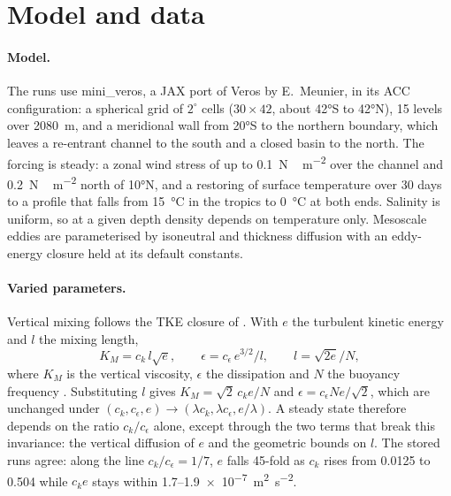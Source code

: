 \documentclass[11pt,a4paper]{article}
\begin{document}
\section{Model and data}
\label{sec:setup}

\paragraph{Model.} The runs use mini\_veros, a JAX port of Veros \cite{hafner2018,hafner2021} by E.~Meunier, in
its ACC configuration: a spherical grid of $2^\circ$ cells ($30\times42$, about \ang{42}S to \ang{42}N), 15 levels
over \SI{2080}{m}, and a meridional wall from \ang{20}S to the northern boundary, which leaves a re-entrant channel
to the south and a closed basin to the north. The forcing is steady: a zonal wind stress of up to
\SI{0.1}{N\,m^{-2}} over the channel and \SI{0.2}{N\,m^{-2}} north of \ang{10}N, and a restoring of surface
temperature over 30 days to a profile that falls from \SI{15}{\celsius} in the tropics to \SI{0}{\celsius} at
both ends. Salinity is uniform, so at a given depth density depends on temperature only. Mesoscale eddies are parameterised by
isoneutral and thickness diffusion \cite{gent1990} with an eddy-energy closure \cite{eden2008} held at its default
constants.

\paragraph{Varied parameters.} Vertical mixing follows the TKE closure of \cite{gaspar1990}. With $e$ the
turbulent kinetic energy and $l$ the mixing length,
\begin{equation}
  K_M = c_k\, l\sqrt{e}, \qquad \epsilon = c_\epsilon\, e^{3/2}/l, \qquad l = \sqrt{2e}/N ,
  \label{eq:tke}
\end{equation}
where $K_M$ is the vertical viscosity, $\epsilon$ the dissipation and $N$ the buoyancy frequency
\cite{blanke1993}. Substituting $l$ gives $K_M = \sqrt2\,c_k e/N$ and $\epsilon = c_\epsilon N e/\sqrt2$, which
are unchanged under $(c_k, c_\epsilon, e) \to (\lambda c_k, \lambda c_\epsilon, e/\lambda)$. A steady state
therefore depends on the ratio $c_k/c_\epsilon$ alone, except through the two terms that break this invariance:
the vertical diffusion of $e$ and the geometric bounds on $l$. The stored runs agree: along the line
$c_k/c_\epsilon = 1/7$, $e$ falls 45-fold as $c_k$ rises from 0.0125 to 0.504 while $c_k e$ stays within
1.7--\SI{1.9e-7}{m^2 s^{-2}}.
\end{document}
